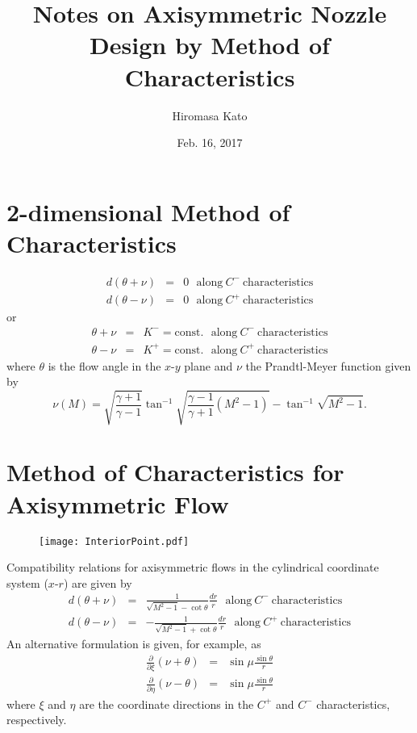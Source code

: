\documentclass[12pt, a4paper]{article}
\begin{document}
\title{Notes on Axisymmetric Nozzle Design by Method of Characteristics}
\author{Hiromasa Kato}
\date{Feb. 16, 2017}
\maketitle

\section{2-dimensional Method of Characteristics}

\begin{eqnarray}
d(\theta + \nu) &=& 0~~~\mathrm{along}~C^-~\mathrm{characteristics} \\
d(\theta - \nu) &=& 0~~~\mathrm{along}~C^+~\mathrm{characteristics}
\end{eqnarray}
or
\begin{eqnarray}
\theta + \nu &=& K^- = \mathrm{const.}~~~\mathrm{along}~C^-~\mathrm{characteristics} \\
\theta - \nu &=& K^+ = \mathrm{const.}~~~\mathrm{along}~C^+~\mathrm{characteristics}
\end{eqnarray}
where $\theta$ is the flow angle in the $x$-$y$ plane and $\nu$ the Prandtl-Meyer function given by
\begin{equation}
\nu(M) = \sqrt{\frac{\gamma + 1}{\gamma - 1}} \tan^{-1}\sqrt{\frac{\gamma - 1}{\gamma + 1}\left(M^2 - 1\right)}
 - \tan^{-1}\sqrt{M^2 - 1}.
\end{equation}

\section{Method of Characteristics for Axisymmetric Flow}

\begin{figure}[!h]
\texttt{[image: InteriorPoint.pdf]}
\end{figure}

Compatibility relations for axisymmetric flows in the cylindrical coordinate system ($x$-$r$) are given by\cite{anderson2004modern}
\begin{eqnarray}
d(\theta + \nu) &=& \frac{1}{\sqrt{M^2 - 1} - \cot\theta}\frac{dr}{r}~~~\mathrm{along}~C^-~\mathrm{characteristics} \\
d(\theta - \nu) &=& -\frac{1}{\sqrt{M^2 - 1} + \cot\theta}\frac{dr}{r}~~~\mathrm{along}~C^+~\mathrm{characteristics} 
\end{eqnarray}
An alternative formulation\cite{liepmann1957elements} is given, for example, as
\begin{eqnarray}
\frac{\partial}{\partial\xi}\left(\nu + \theta\right) &=& \sin\mu\frac{\sin\theta}{r} \\
\frac{\partial}{\partial\eta}\left(\nu - \theta\right) &=& \sin\mu\frac{\sin\theta}{r}
\end{eqnarray}
where $\xi$ and $\eta$ are the coordinate directions in the $C^+$ and $C^-$ characteristics, respectively.



\end{document}
